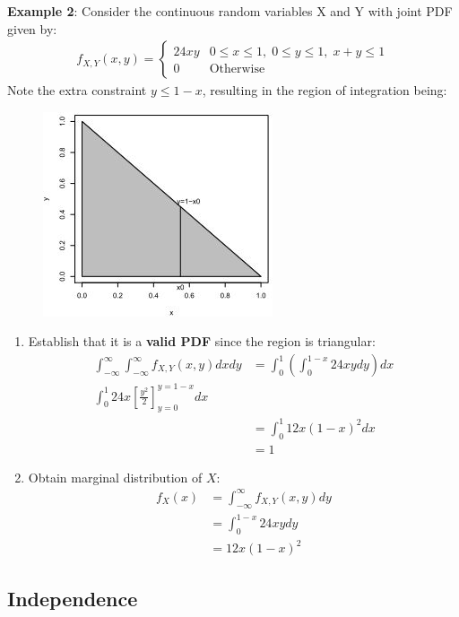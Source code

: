 \documentclass[10pt,a4paper]{article}
\begin{document}
\textbf{Example 2}: Consider the continuous random variables X and Y with joint PDF given by:
\begin{align*}
    f_{X,Y}(x,y) = 
    \begin{cases}
        24xy & 0\leq x \leq 1, \; 0 \leq y \leq 1, \; x+y \leq 1 \\
        0 & \text{Otherwise}
    \end{cases}
\end{align*}
Note the extra constraint $y \leq 1-x$, resulting in the region of integration being:
\begin{figure} [h!]
    \centering
    \includegraphics[scale=0.7]{Ex2_inter.JPG}
\end{figure}
\begin{enumerate}
    \item Establish that it is a \textbf{valid PDF} since the region is triangular:
    \begin{align*}
        \int_{-\infty}^{\infty} \int_{-\infty}^{\infty} f_{X,Y}(x,y) dxdy &= \int_0^1\left(\int_0^{1-x}24xy dy\right) dx \\
        \int_0^1 24x \left[\frac{y^2}{2}\right]_{y=0}^{y=1-x} dx \\
        &= \int_0^1 12x(1-x)^2 dx \\
        &= 1
    \end{align*}
    \item Obtain marginal distribution of $X$:
    \begin{align*}
        f_X(x) &= \int_{-\infty}^\infty f_{X,Y}(x,y) dy \\
        &= \int_0^{1-x}24xy dy \\
        &= 12x(1-x)^2
    \end{align*}
\end{enumerate}

\subsection{Independence}
\end{document}

